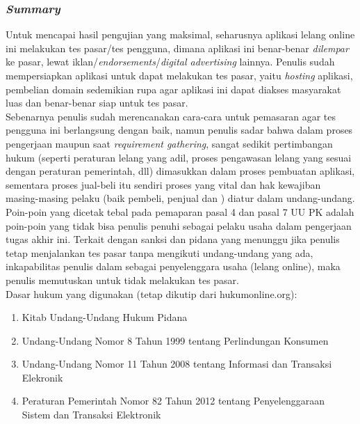 \subsubsection{\textit{Summary}}
	\indent Untuk mencapai hasil pengujian yang maksimal, seharusnya aplikasi lelang online ini melakukan tes pasar/tes pengguna, dimana aplikasi ini benar-benar \textit{dilempar} ke pasar, lewat iklan/\textit{endorsements}/\textit{digital advertising} lainnya. Penulis sudah mempersiapkan aplikasi untuk dapat melakukan tes pasar, yaitu \textit{hosting} aplikasi, pembelian domain sedemikian rupa agar aplikasi ini dapat diakses masyarakat luas dan benar-benar siap untuk tes pasar.\\
	\indent Sebenarnya penulis sudah merencanakan cara-cara untuk pemasaran agar tes pengguna ini berlangsung dengan baik, namun penulis sadar bahwa dalam proses pengerjaan maupun saat \textit{requirement gathering}, sangat sedikit pertimbangan hukum (seperti peraturan lelang yang adil, proses pengawasan lelang yang sesuai dengan peraturan pemerintah, dll) dimasukkan dalam proses pembuatan aplikasi, sementara proses jual-beli itu sendiri proses yang vital dan hak kewajiban masing-masing pelaku (baik pembeli, penjual dan ) diatur dalam undang-undang. \\ 
	\indent Poin-poin yang dicetak tebal pada pemaparan pasal 4 dan pasal 7 UU PK adalah poin-poin yang tidak bisa penulis penuhi sebagai pelaku usaha dalam pengerjaan tugas akhir ini. Terkait dengan sanksi dan pidana yang menunggu jika penulis tetap menjalankan tes pasar tanpa mengikuti undang-undang yang ada, inkapabilitas penulis dalam sebagai penyelenggara usaha (lelang online), maka penulis memutuskan untuk tidak melakukan tes pasar.
	\\

	Dasar hukum yang digunakan (tetap dikutip dari hukumonline.org):
	\begin{enumerate}
		\item Kitab Undang-Undang Hukum Pidana
		\item Undang-Undang Nomor 8 Tahun 1999 tentang Perlindungan Konsumen
		\item Undang-Undang Nomor 11 Tahun 2008 tentang Informasi dan Transaksi Elekronik
		\item Peraturan Pemerintah Nomor 82 Tahun 2012 tentang Penyelenggaraan Sistem dan Transaksi Elektronik
	\end{enumerate}